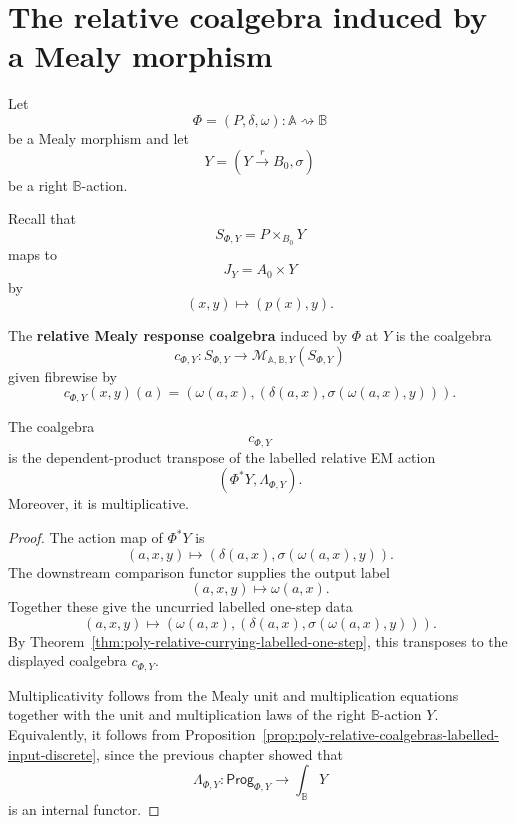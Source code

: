 \section{The relative coalgebra induced by a Mealy morphism}
\label{sec:poly-relative-mealy-induced-coalgebra}

Let
\[
\Phi=(P,\delta,\omega):\mathbb A\rightsquigarrow\mathbb B
\]
be a Mealy morphism and let
\[
Y=(Y\xrightarrow{r}B_0,\sigma)
\]
be a right \(\mathbb B\)-action.

Recall that
\[
S_{\Phi,Y}=P\times_{B_0}Y
\]
maps to
\[
J_Y=A_0\times Y
\]
by
\[
(x,y)\longmapsto(p(x),y).
\]

\begin{definition}
\label{def:poly-relative-mealy-response-coalgebra}
The \textbf{relative Mealy response coalgebra} induced by \(\Phi\) at \(Y\) is
the coalgebra
\[
c_{\Phi,Y}:
S_{\Phi,Y}\to
\mathcal M_{\mathbb A,\mathbb B,Y}(S_{\Phi,Y})
\]
given fibrewise by
\[
c_{\Phi,Y}(x,y)(a)
=
\left(
\omega(a,x),
\left(
\delta(a,x),
\sigma(\omega(a,x),y)
\right)
\right).
\]
\end{definition}

\begin{theorem}
\label{thm:poly-relative-mealy-coalgebra-transpose}
The coalgebra
\[
c_{\Phi,Y}
\]
is the dependent-product transpose of the labelled relative EM action
\[
(\Phi^\ast Y,\Lambda_{\Phi,Y}).
\]
Moreover, it is multiplicative.
\end{theorem}

\begin{proof}
The action map of \(\Phi^\ast Y\) is
\[
(a,x,y)
\longmapsto
\left(
\delta(a,x),
\sigma(\omega(a,x),y)
\right).
\]
The downstream comparison functor supplies the output label
\[
(a,x,y)\longmapsto \omega(a,x).
\]
Together these give the uncurried labelled one-step data
\[
(a,x,y)
\longmapsto
\left(
\omega(a,x),
\left(
\delta(a,x),
\sigma(\omega(a,x),y)
\right)
\right).
\]
By Theorem~\ref{thm:poly-relative-currying-labelled-one-step}, this transposes
to the displayed coalgebra \(c_{\Phi,Y}\).

Multiplicativity follows from the Mealy unit and multiplication equations
together with the unit and multiplication laws of the right
\(\mathbb B\)-action \(Y\).  Equivalently, it follows from
Proposition~\ref{prop:poly-relative-coalgebras-labelled-input-discrete},
since the previous chapter showed that
\[
\Lambda_{\Phi,Y}:\mathsf{Prog}_{\Phi,Y}\to\int_{\mathbb B}Y
\]
is an internal functor.
\end{proof}

